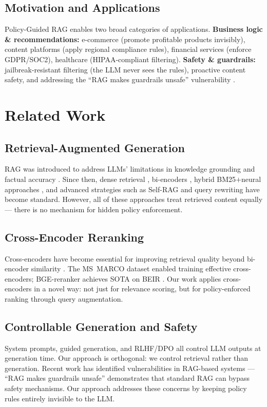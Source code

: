 \documentclass[11pt]{article}
\begin{document}
\subsection{Motivation and Applications}
Policy-Guided RAG enables two broad categories of applications. \textbf{Business logic \&
recommendations:} e-commerce (promote profitable products invisibly), content platforms
(apply regional compliance rules), financial services (enforce GDPR/SOC2), healthcare
(HIPAA-compliant filtering). \textbf{Safety \& guardrails:} jailbreak-resistant filtering
(the LLM never sees the rules), proactive content safety, and addressing the ``RAG makes
guardrails unsafe'' vulnerability \citep{robey2024rag}.

\section{Related Work}

\subsection{Retrieval-Augmented Generation}
RAG was introduced to address LLMs' limitations in knowledge grounding and factual accuracy
\citep{lewis2020rag}. Since then, dense retrieval \citep{karpukhin2020dpr}, bi-encoders
\citep{reimers2019sbert}, hybrid BM25$+$neural approaches \citep{robertson2009bm25}, and
advanced strategies such as Self-RAG \citep{asai2023selfrag} and query rewriting
\citep{ma2023query} have become standard. However, all of these approaches treat retrieved
content equally --- there is no mechanism for hidden policy enforcement.

\subsection{Cross-Encoder Reranking}
Cross-encoders have become essential for improving retrieval quality beyond bi-encoder
similarity \citep{nogueira2019passage}. The MS~MARCO dataset \citep{nguyen2016msmarco}
enabled training effective cross-encoders; BGE-reranker \citep{xiao2023cpack} achieves SOTA
on BEIR \citep{thakur2021beir}. Our work applies cross-encoders in a novel way: not just for
relevance scoring, but for policy-enforced ranking through query augmentation.

\subsection{Controllable Generation and Safety}
System prompts, guided generation, and RLHF/DPO \citep{ouyang2022instruct,rafailov2024dpo}
all control LLM outputs at generation time. Our approach is orthogonal: we control retrieval
rather than generation. Recent work has identified vulnerabilities in RAG-based systems ---
``RAG makes guardrails unsafe'' \citep{robey2024rag} demonstrates that standard RAG can
bypass safety mechanisms. Our approach addresses these concerns by keeping policy rules
entirely invisible to the LLM.
\end{document}
